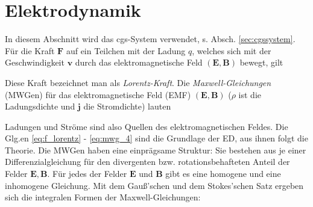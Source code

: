 \documentclass{book}
\renewcommand{\partial}{\text{{\tgp ∂}}}
\begin{document}
\section{Elektrodynamik}
\label{sec:elektrodynamik}

In diesem Abschnitt wird das cgs-System verwendet, s. Absch. \ref{sec:cgssystem}. Für die Kraft $\mathbf{F}$ auf ein Teilchen mit der Ladung $q$, welches sich mit der Geschwindigkeit $\mathbf{v}$ durch das elektromagnetische Feld $\left(\mathbf{E}, \mathbf{B}\right)$ bewegt, gilt
%
\begin{center}
\end{center}
%
Diese Kraft bezeichnet man als \textit{Lorentz-Kraft}. Die \textit{Maxwell-Gleichungen} (MWGen) für das elektromagnetische Feld (EMF) $\left(\mathbf{E}, \mathbf{B}\right)$ ($\rho$ ist die Ladungsdichte und $\mathbf{j}$ die Stromdichte) lauten
%
\begin{center}
\doublebox{\parbox{0.8\textwidth}{
\begin{center}
\begin{eqnarray}
\nabla\cdot\mathbf{E} & = & 4\pi\rho\label{eq:mwg_1},\\
\nabla\cdot\mathbf{B} & = & 0\label{eq:mwg_2},\\
\nabla\times\mathbf{E} + \frac{1}{c}\frac{\partial\mathbf{B}}{\partial t} & = & \mathbf{0}\label{eq:mwg_3},\\
\nabla\times\mathbf{B} - \frac{1}{c}\frac{\partial\mathbf{E}}{\partial t} & = & \frac{4\pi}{c}\mathbf{j}\label{eq:mwg_4}.
\end{eqnarray}
\end{center}
}}
\end{center}
%
Ladungen und Ströme sind also Quellen des elektromagnetischen Feldes. Die Glg.en \eqref{eq:f_lorentz} - \eqref{eq:mwg_4} sind die Grundlage der ED, aus ihnen folgt die Theorie. Die MWGen haben eine einprägsame Struktur: Sie bestehen aus je einer Differenzialgleichung für den divergenten bzw. rotationsbehafteten Anteil der Felder $\mathbf{E}, \mathbf{B}$. Für jedes der Felder $\mathbf{E}$ und $\mathbf{B}$ gibt es eine homogene und eine inhomogene Gleichung. Mit dem Gauß'schen und dem Stokes'schen Satz ergeben sich die integralen Formen der Maxwell-Gleichungen:
\end{document}
